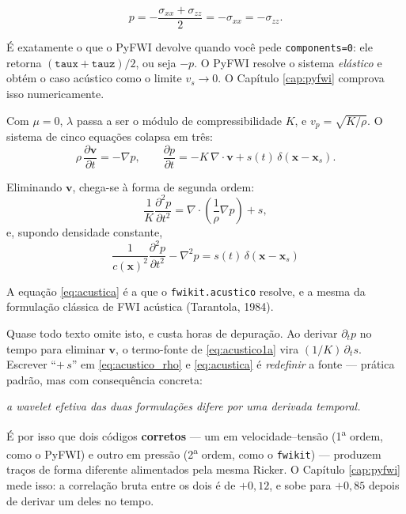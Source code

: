 \documentclass[11pt,a4paper,oneside]{report}
\newcommand{\arq}[1]{\texttt{\small #1}}
\begin{document}
\begin{equation}
p = -\frac{\sigma_{xx} + \sigma_{zz}}{2} = -\sigma_{xx} = -\sigma_{zz}.
\label{eq:pressao}
\end{equation}

\begin{atencao}
É exatamente o que o PyFWI devolve quando você pede
\texttt{components=0}: ele retorna $(\texttt{taux}+\texttt{tauz})/2$, ou seja
$-p$. O PyFWI resolve o sistema \emph{elástico} e obtém o caso acústico como
o limite $v_s \to 0$. O Capítulo \ref{cap:pyfwi} comprova isso
numericamente.
\end{atencao}

Com $\mu = 0$, $\lambda$ passa a ser o módulo de compressibilidade $K$, e
$v_p = \sqrt{K/\rho}$. O sistema de cinco equações colapsa em três:
\begin{equation}
\rho\,\frac{\partial \mathbf{v}}{\partial t} = -\nabla p,
\qquad
\frac{\partial p}{\partial t} = -K\,\nabla\!\cdot\!\mathbf{v} + s(t)\,\delta(\mathbf{x}-\mathbf{x}_s).
\label{eq:acustico1a}
\end{equation}

Eliminando $\mathbf{v}$, chega-se à forma de segunda ordem:
\begin{equation}
\frac{1}{K}\frac{\partial^{2} p}{\partial t^{2}}
 = \nabla\!\cdot\!\left(\frac{1}{\rho}\nabla p\right) + s ,
\label{eq:acustico_rho}
\end{equation}
e, supondo densidade constante,
\begin{equation}
\boxed{\;
\frac{1}{c(\mathbf{x})^{2}}\frac{\partial^{2} p}{\partial t^{2}}
 - \nabla^{2} p = s(t)\,\delta(\mathbf{x}-\mathbf{x}_s)\;}
\label{eq:acustica}
\end{equation}

A equação \eqref{eq:acustica} é a que o \arq{fwikit.acustico} resolve, e a
mesma da formulação clássica de FWI acústica (Tarantola, 1984).

\begin{armadilha}
Quase todo texto omite isto, e custa horas de depuração. Ao derivar
$\partial_t p$ no tempo para eliminar $\mathbf{v}$, o termo-fonte de
\eqref{eq:acustico1a} vira $(1/K)\,\partial_t s$. Escrever ``$+\,s$'' em
\eqref{eq:acustico_rho} e \eqref{eq:acustica} é \emph{redefinir} a fonte ---
prática padrão, mas com consequência concreta:

\begin{center}
\emph{a wavelet efetiva das duas formulações difere por uma derivada temporal.}
\end{center}

É por isso que dois códigos \textbf{corretos} --- um em velocidade--tensão
(1\textsuperscript{a} ordem, como o PyFWI) e outro em pressão
(2\textsuperscript{a} ordem, como o \arq{fwikit}) --- produzem traços de forma
diferente alimentados pela mesma Ricker. O Capítulo \ref{cap:pyfwi} mede isso:
a correlação bruta entre os dois é de $+0{,}12$, e sobe para $+0{,}85$ depois
de derivar um deles no tempo.
\end{armadilha}
\end{document}
